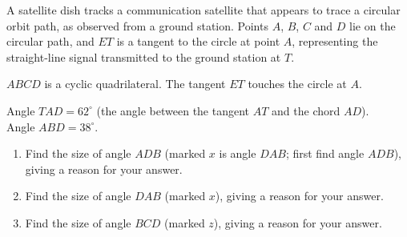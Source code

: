 \begin{question}
\noindent A satellite dish tracks a communication satellite that appears to trace a circular orbit path, as observed from a ground station. Points $A$, $B$, $C$ and $D$ lie on the circular path, and $ET$ is a tangent to the circle at point $A$, representing the straight-line signal transmitted to the ground station at $T$.

$ABCD$ is a cyclic quadrilateral. The tangent $ET$ touches the circle at $A$.

\begin{center}
\end{center}

\noindent Angle $TAD = 62^\circ$ (the angle between the tangent $AT$ and the chord $AD$).\\
Angle $ABD = 38^\circ$.

\begin{enumerate}
    \item[(a)] Find the size of angle $ADB$ (marked $x$ is angle $DAB$; first find angle $ADB$), giving a reason for your answer.

    \vspace{4cm}

    \item[(b)] Find the size of angle $DAB$ (marked $x$), giving a reason for your answer.

    \vspace{3cm}

    \item[(c)] Find the size of angle $BCD$ (marked $z$), giving a reason for your answer.

    \vspace{3cm}
\end{enumerate}
\end{question}
